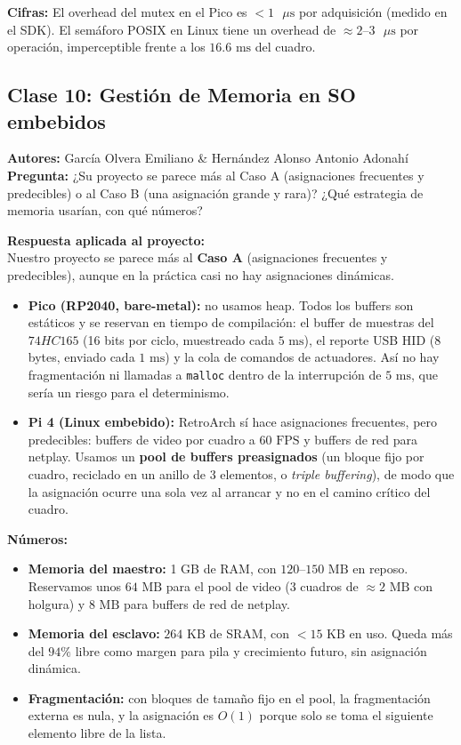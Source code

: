 \documentclass[conference]{IEEEtran}
\begin{document}
\textbf{Cifras:} El overhead del mutex en el Pico es $< 1\text{ }\mu\text{s}$ por adquisición (medido en el SDK). El semáforo POSIX en Linux tiene un overhead de $\approx 2\text{--}3\text{ }\mu\text{s}$ por operación, imperceptible frente a los $16.6\text{ ms}$ del cuadro.

\subsection{Clase 10: Gestión de Memoria en SO embebidos}
\textbf{Autores:} García Olvera Emiliano \& Hernández Alonso Antonio Adonahí \\
\textbf{Pregunta:} ¿Su proyecto se parece más al Caso A (asignaciones frecuentes y predecibles) o al Caso B (una asignación grande y rara)? ¿Qué estrategia de memoria usarían, con qué números?

\textbf{Respuesta aplicada al proyecto:} \\
Nuestro proyecto se parece más al \textbf{Caso A} (asignaciones frecuentes y predecibles), aunque en la práctica casi no hay asignaciones dinámicas.

\begin{itemize}
	\item \textbf{Pico (RP2040, bare-metal):} no usamos heap. Todos los buffers son estáticos y se reservan en tiempo de compilación: el buffer de muestras del $74HC165$ (16 bits por ciclo, muestreado cada $5\text{ ms}$), el reporte USB HID (8 bytes, enviado cada $1\text{ ms}$) y la cola de comandos de actuadores. Así no hay fragmentación ni llamadas a \texttt{malloc} dentro de la interrupción de $5\text{ ms}$, que sería un riesgo para el determinismo.
	\item \textbf{Pi 4 (Linux embebido):} RetroArch sí hace asignaciones frecuentes, pero predecibles: buffers de video por cuadro a $60\text{ FPS}$ y buffers de red para netplay. Usamos un \textbf{pool de buffers preasignados} (un bloque fijo por cuadro, reciclado en un anillo de 3 elementos, o \textit{triple buffering}), de modo que la asignación ocurre una sola vez al arrancar y no en el camino crítico del cuadro.
\end{itemize}

\textbf{Números:}
\begin{itemize}
	\item \textbf{Memoria del maestro:} 1 GB de RAM, con $120\text{--}150\text{ MB}$ en reposo. Reservamos unos $64\text{ MB}$ para el pool de video (3 cuadros de $\approx 2\text{ MB}$ con holgura) y $8\text{ MB}$ para buffers de red de netplay.
	\item \textbf{Memoria del esclavo:} $264\text{ KB}$ de SRAM, con $< 15\text{ KB}$ en uso. Queda más del $94\%$ libre como margen para pila y crecimiento futuro, sin asignación dinámica.
	\item \textbf{Fragmentación:} con bloques de tamaño fijo en el pool, la fragmentación externa es nula, y la asignación es $O(1)$ porque solo se toma el siguiente elemento libre de la lista.
\end{itemize}
\end{document}
